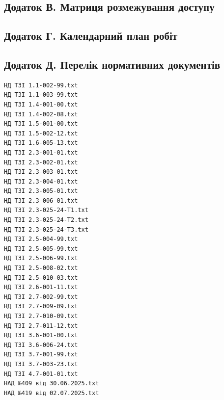 \documentclass{article}
\begin{document}
\subsection{Додаток В. Матриця розмежування доступу}

\subsection{Додаток Г. Календарний план робіт}

\newpage
\subsection{Додаток Д. Перелік нормативних документів}

{\scriptsize
{}
\begin{verbatim}
НД ТЗІ 1.1-002-99.txt
НД ТЗІ 1.1-003-99.txt
НД ТЗІ 1.4-001-00.txt
НД ТЗІ 1.4-002-08.txt
НД ТЗІ 1.5-001-00.txt
НД ТЗІ 1.5-002-12.txt
НД ТЗІ 1.6-005-13.txt
НД ТЗІ 2.3-001-01.txt
НД ТЗІ 2.3-002-01.txt
НД ТЗІ 2.3-003-01.txt
НД ТЗІ 2.3-004-01.txt
НД ТЗІ 2.3-005-01.txt
НД ТЗІ 2.3-006-01.txt
НД ТЗІ 2.3-025-24-Т1.txt
НД ТЗІ 2.3-025-24-Т2.txt
НД ТЗІ 2.3-025-24-Т3.txt
НД ТЗІ 2.5-004-99.txt
НД ТЗІ 2.5-005-99.txt
НД ТЗІ 2.5-006-99.txt
НД ТЗІ 2.5-008-02.txt
НД ТЗІ 2.5-010-03.txt
НД ТЗІ 2.6-001-11.txt
НД ТЗІ 2.7-002-99.txt
НД ТЗІ 2.7-009-09.txt
НД ТЗІ 2.7-010-09.txt
НД ТЗІ 2.7-011-12.txt
НД ТЗІ 3.6-001-00.txt
НД ТЗІ 3.6-006-24.txt
НД ТЗІ 3.7-001-99.txt
НД ТЗІ 3.7-003-23.txt
НД ТЗІ 4.7-001-01.txt
НАД №409 від 30.06.2025.txt
НАД №419 від 02.07.2025.txt
\end{verbatim}
}
\end{document}
